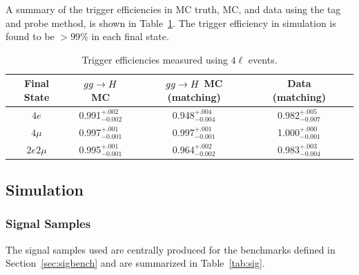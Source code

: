A summary of the trigger efficiencies in MC truth, MC, and data using the tag and probe method, is shown in Table~\ref{tab:TrigEff}. The trigger
efficiency in simulation is found to be $>99\%$ in each final state.

\begin{table}[h]
    \centering
    \begin{tabular}{|c|c|c|c|c|} 
\hline %
Final State  & $gg\to H$ MC & $gg\to H$ MC (matching)  & Data (matching)   \\
\hline %
$4e$  & 0.991$^{+.002}_{-0.002}$ & 0.948$^{+.004}_{-0.004}$ & 0.982$^{+.005}_{-0.007}$ \\
$4\mu$  & 0.997$^{+.001}_{-0.001}$ & 0.997$^{+.001}_{-0.001}$ & 1.000$^{+.000}_{-0.001}$ \\
$2e2\mu$  & 0.995$^{+.001}_{-0.001}$ & 0.964$^{+.002}_{-0.002}$ & 0.983$^{+.003}_{-0.004}$ \\
\hline %
    \end{tabular}
    \caption{Trigger efficiencies measured using $4\ell$ events.}
    \label{tab:TrigEff}
\end{table}

\subsection{Simulation}

\subsubsection{Signal Samples}

The signal samples used are centrally produced for the benchmarks defined in Section~\ref{sec:sigbench} and are summarized in Table~\ref{tab:sig}.

\begin{table}
\caption{Benchmark signal samples analyzed.}\label{tab:sig}
\end{table}

